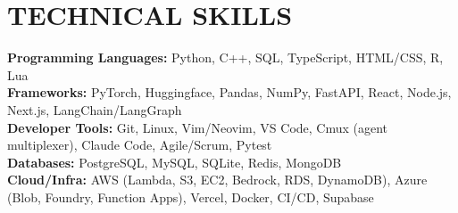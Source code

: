 \documentclass[letterpaper,11pt]{article}
\begin{document}
\section{\textbf{TECHNICAL SKILLS}}
 \begin{itemize}[leftmargin=0.15in, label={}, itemsep=-3pt, topsep=0pt]
    \small{\item{
     \textbf{Programming Languages:}{ Python, C++, SQL, TypeScript, HTML/CSS, R, Lua} \\
     \textbf{Frameworks:}{ PyTorch, Huggingface, Pandas, NumPy, FastAPI, React, Node.js, Next.js, LangChain/LangGraph} \\
     \textbf{Developer Tools:}{ Git, Linux, Vim/Neovim, VS Code, Cmux (agent multiplexer), Claude Code, Agile/Scrum, Pytest} \\
     \textbf{Databases:}{ PostgreSQL, MySQL, SQLite, Redis, MongoDB} \\
     \textbf{Cloud/Infra:}{ AWS (Lambda, S3, EC2, Bedrock, RDS, DynamoDB), Azure (Blob, Foundry, Function Apps), Vercel, Docker, CI/CD, Supabase}
    }}
 \end{itemize}

\end{document}
